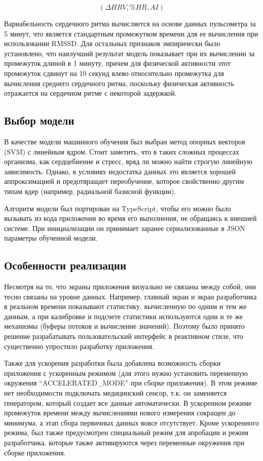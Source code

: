\documentclass[14pt]{matmex-diploma-custom}
\begin{document}
\begin{equation} \label{eq:feature_vector}
  ({\Delta}HRV, \%HR, AI)
\end{equation}

Вариабельность сердечного ритма вычисляется на основе данных пульсометра за 5
минут, что является стандартным промежутком времени для ее вычисления при
использовании RMSSD. Для остальных признаков эмпирически было установлено, что
наилучший результат модель показывает при их вычислении за промежуток длиной в 1
минуту, причем для физической активности этот промежуток сдвинут на 10 секунд
влево относительно промежутка для вычисления среднего сердечного ритма,
поскольку физическая активность отражается на сердечном ритме с некоторой
задержкой.

\subsection{Выбор модели}
В качестве модели машинного обучения был выбран метод опорных векторов (SVM) с
линейным ядром. Стоит заметить, что в таких сложных процессах организма, как
сердцебиение и стресс, вряд ли можно найти строгую линейную зависимость. Однако,
в условиях недостатка данных это является хорошей аппроксимацией и предотвращает
переобучение, которое свойственно другим типам ядер (например, радиальной
базисной функции).

Алгоритм модели был портирован на TypeScript, чтобы его можно было вызывать из
кода приложения во время его выполнения, не обращаясь к внешней системе. При
инициализации он принимает заранее сериализованные в JSON параметры обученной
модели.

\subsection{Особенности реализации}
Несмотря на то, что экраны приложения визуально не связаны между собой, они
тесно связаны на уровне данных. Например, главный экран и экран разработчика в
реальном времени показывают статистику, вычисленную по одним и тем же данным, а
при калибровке и подсчете статистики используются одни и те же механизмы (буферы
потоков и вычисление значений). Поэтому было принято решение разрабатывать
пользовательский интерфейс в реактивном стиле, что существенно упростило
разработку приложения.

Также для ускорения разработки была добавлена возможность сборки приложения с
ускоренным режимом (для этого нужно установить переменную окружения
``ACCELERATED\_MODE'' при сборке приложения). В этом режиме нет необходимости
подключать медицинский сенсор, т.к. он заменяется генератором, который создает
все данные автоматически. В ускоренном режиме промежуток времени между
вычислениями нового измерения сокращен до минимума, а этап сбора первичных
данных вовсе отсутствует. Кроме ускоренного режима, был также предусмотрен
специальный режим для апробации и режим разработчика, которые также активируются
через переменные окружения при сборке приложения.
\end{document}
